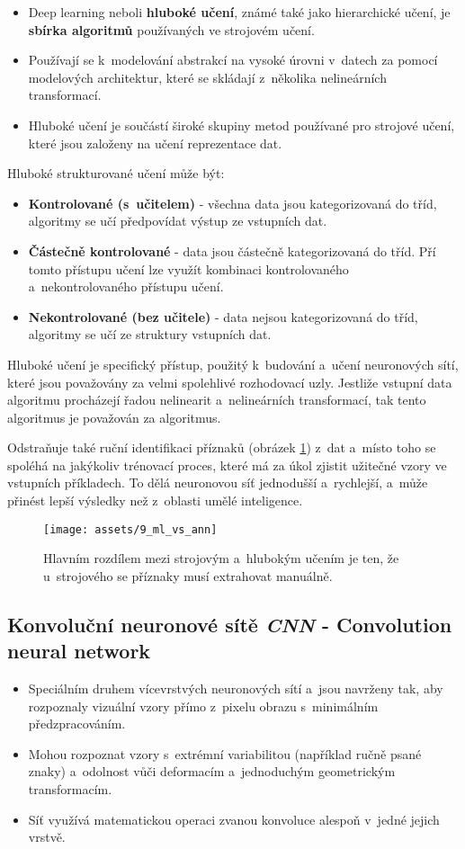 \begin{itemize}
    \item Deep learning neboli \textbf{hluboké učení}, známé také jako hierarchické učení, je \textbf{sbírka algoritmů} používaných ve strojovém učení.
    \item Používají se k~modelování abstrakcí na vysoké úrovni v~datech za pomocí modelových architektur, které se skládají z~několika nelineárních transformací.
    \item Hluboké učení je součástí široké skupiny metod používané pro strojové učení, které jsou založeny na učení reprezentace dat.
\end{itemize}
Hluboké strukturované učení může být:
\begin{itemize}
    \item{\textbf{Kontrolované (s~učitelem)} - všechna data jsou kategorizovaná do tříd, algoritmy se učí předpovídat výstup ze vstupních dat.}
    \item{\textbf{Částečně kontrolované} - data jsou částečně kategorizovaná do tříd. Pří tomto přístupu učení lze využít kombinaci kontrolovaného a~nekontrolovaného přístupu učení.}
    \item{\textbf{Nekontrolované (bez učitele)} - data nejsou kategorizovaná do tříd, algoritmy se učí ze struktury vstupních dat.}
\end{itemize}
Hluboké učení je specifický přístup, použitý k~budování a~učení neuronových sítí, které jsou považovány za velmi spolehlivé rozhodovací uzly. Jestliže vstupní data algoritmu procházejí řadou nelinearit a~nelineárních transformací, tak tento algoritmus je považován za  algoritmus.

Odstraňuje také ruční identifikaci příznaků (obrázek \ref{fig:ml_vs_ann}) z~dat a~místo toho se spoléhá na jakýkoliv trénovací proces, které má za úkol zjistit užitečné vzory ve vstupních příkladech. To dělá neuronovou síť jednodušší a~rychlejší, a~může přinést lepší výsledky než z~oblasti umělé inteligence.

\begin{figure}[H]
    \centering
    \texttt{[image: assets/9\_ml\_vs\_ann]}
    \caption{Hlavním rozdílem mezi strojovým a~hlubokým učením je ten, že u~strojového se příznaky musí extrahovat manuálně.}
    \label{fig:ml_vs_ann}
\end{figure}

\subsection{Konvoluční neuronové sítě \textit{CNN} - Convolution neural network}
\begin{itemize}
    \item Speciálním druhem vícevrstvých neuronových sítí a~jsou navrženy tak, aby rozpoznaly vizuální vzory přímo z~pixelu obrazu s~minimálním předzpracováním.
    \item Mohou rozpoznat vzory s~extrémní variabilitou (například ručně psané znaky) a~odolnost vůči deformacím a~jednoduchým geometrickým transformacím.
    \item Síť využívá matematickou operaci zvanou konvoluce alespoň v~jedné jejich vrstvě.
\end{itemize}

